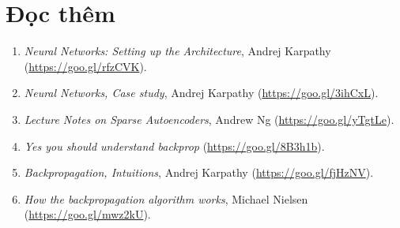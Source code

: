  
 
 
 
 
 
\newpage 
\section{Đọc thêm}
\begin{enumerate}
    \item \textit{Neural Networks: Setting up the Architecture}, Andrej Karpathy
    (\url{https://goo.gl/rfzCVK}). 

    \item \textit{Neural Networks, Case study}, Andrej Karpathy
    (\url{https://goo.gl/3ihCxL}).
 
    \item \textit{Lecture Notes on Sparse Autoencoders}, Andrew Ng
    (\url{https://goo.gl/yTgtLe}).
 
    \item \textit{Yes you should understand backprop} (\url{https://goo.gl/8B3h1b}). 
 
    \item \textit{Backpropagation, Intuitions}, Andrej Karpathy
    (\url{https://goo.gl/fjHzNV}).
 
    \item \textit{How the backpropagation algorithm works}, Michael Nielsen
    (\url{https://goo.gl/mwz2kU}). 
\end{enumerate}



 
